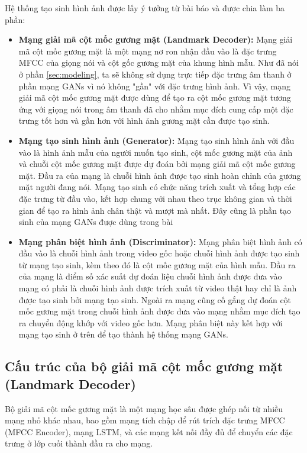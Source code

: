 Hệ thống tạo sinh hình ảnh được lấy ý tưởng từ bài báo \cite{chen2019} và được chia làm ba phần:
\begin{itemize}
    \item \textbf{Mạng giải mã cột mốc gương mặt (Landmark Decoder):} Mạng giải mã cột mốc gương mặt là một mạng nơ ron nhận đầu vào là đặc trưng MFCC của giọng nói và cột gốc gương mặt của khung hình mẫu. Như đã nói ở phần \ref{sec:modeling}, ta sẽ không sử dụng trực tiếp đặc trưng âm thanh ở phần mạng GANs vì nó không "gần" với đặc trưng hình ảnh. Vì vậy, mạng giải mã cột mốc gương mặt được dùng để tạo ra cột mốc gương mặt tương ứng với giọng nói trong âm thanh đã cho nhằm mục đích cung cấp một đặc trưng tốt hơn và gần hơn với hình ảnh gương mặt cần được tạo sinh.
    \item \textbf{Mạng tạo sinh hình ảnh (Generator):} Mạng tạo sinh hình ảnh với đầu vào là hình ảnh mẫu của người muốn tạo sinh, cột mốc gương mặt của ảnh và chuỗi cột mốc gương mặt được dự đoán bởi mạng giải mã cột mốc gương mặt. Đầu ra của mạng là chuỗi hình ảnh được tạo sinh hoàn chỉnh của gương mặt người đang nói. Mạng tạo sinh có chức năng trích xuất và tổng hợp các đặc trưng từ đầu vào, kết hợp chung với nhau theo trục không gian và thời gian để tạo ra hình ảnh chân thật và mượt mà nhất. Đây cũng là phần tạo sinh của mạng GANs được dùng trong bài
    \item \textbf{Mạng phân biệt hình ảnh (Discriminator):} Mạng phân biệt hình ảnh có đầu vào là chuỗi hình ảnh trong video gốc hoặc chuỗi hình ảnh được tạo sinh từ mạng tạo sinh, kèm theo đó là cột mốc gương mặt của hình mẫu. Đầu ra của mạng là điểm số xác suất dự đoán liệu chuỗi hình ảnh được đưa vào mạng có phải là chuỗi hình ảnh được trích xuất từ video thật hay chỉ là ảnh được tạo sinh bởi mạng tạo sinh. Ngoài ra mạng cũng cố gắng dự đoán cột mốc gương mặt trong chuỗi hình ảnh được đưa vào mạng nhằm mục đích tạo ra chuyển động khớp với video gốc hơn. Mạng phân biệt này kết hợp với mạng tạo sinh ở trên để tạo thành hệ thống mạng GANs.
\end{itemize}

\subsection{Cấu trúc của bộ giải mã cột mốc gương mặt (Landmark Decoder)}

Bộ giải mã cột mốc gương mặt là một mạng học sâu được ghép nối từ nhiều mạng nhỏ khác nhau, bao gồm mạng tích chập để rút trích đặc trưng MFCC (MFCC Encoder), mạng LSTM, và các mạng kết nối đầy đủ để chuyển các đặc trưng ở lớp cuối thành đầu ra cho mạng.

